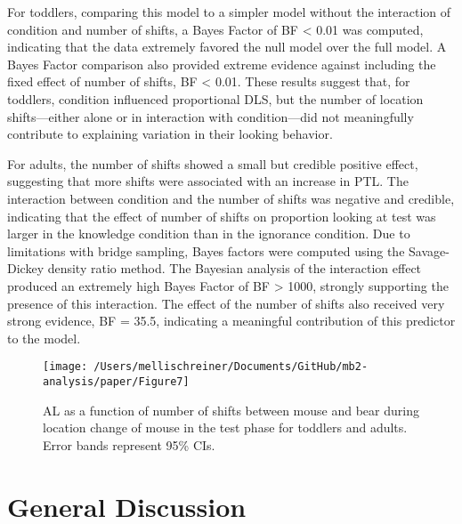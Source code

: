 \documentclass[
  man,floatsintext]{apa6}
\begin{document}
For toddlers, comparing this model to a simpler model without the interaction of condition and number of shifts, a Bayes Factor of BF \textless{} 0.01 was computed, indicating that the data extremely favored the null model over the full model. A Bayes Factor comparison also provided extreme evidence against including the fixed effect of number of shifts, BF \textless{} 0.01. These results suggest that, for toddlers, condition influenced proportional DLS, but the number of location shifts---either alone or in interaction with condition---did not meaningfully contribute to explaining variation in their looking behavior.

For adults, the number of shifts showed a small but credible positive effect, suggesting that more shifts were associated with an increase in PTL. The interaction between condition and the number of shifts was negative and credible, indicating that the effect of number of shifts on proportion looking at test was larger in the knowledge condition than in the ignorance condition. Due to limitations with bridge sampling, Bayes factors were computed using the Savage-Dickey density ratio method. The Bayesian analysis of the interaction effect produced an extremely high Bayes Factor of BF \textgreater{} 1000, strongly supporting the presence of this interaction. The effect of the number of shifts also received very strong evidence, BF = 35.5, indicating a meaningful contribution of this predictor to the model.

\begin{figure}

{\centering \texttt{[image: /Users/mellischreiner/Documents/GitHub/mb2-analysis/paper/Figure7]} 

}

\caption{AL as a function of number of shifts between mouse and bear during location change of mouse in the test phase for toddlers and adults. Error bands represent 95\% CIs.}\label{fig:fig9}
\end{figure}

\section{General Discussion}\label{general-discussion}
\end{document}
